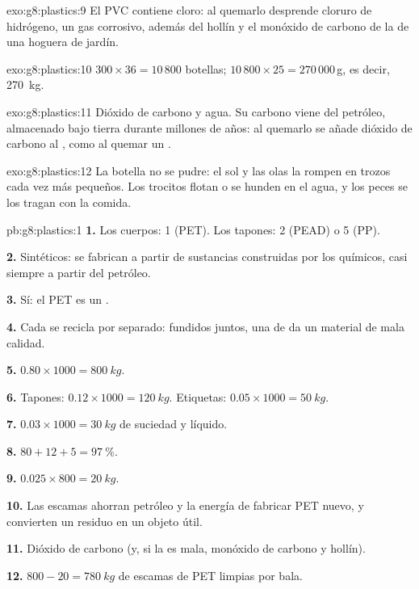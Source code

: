 \begin{solution}{exo:g8:plastics:9}
El PVC contiene cloro: al quemarlo desprende cloruro de hidrógeno, un
gas corrosivo, además del hollín y el monóxido de carbono de la
 de una hoguera de jardín.
\end{solution}

\begin{solution}{exo:g8:plastics:10}
$300 \times 36 = 10\,800$ botellas; $10\,800 \times 25 = 270\,000$\,g, es
decir, \qty{270}{kg}.
\end{solution}

\begin{solution}{exo:g8:plastics:11}
Dióxido de carbono y agua. Su carbono viene del petróleo, almacenado bajo
tierra durante millones de años: al quemarlo se añade dióxido de carbono
al , como al quemar un .
\end{solution}

\begin{solution}{exo:g8:plastics:12}
La botella no se pudre: el sol y las olas la rompen en trozos cada vez
más pequeños. Los trocitos flotan o se hunden en el agua, y los peces
se los tragan con la comida.
\end{solution}

\begin{solution}{pb:g8:plastics:1}
\textbf{1.} Los cuerpos: 1 (PET). Los tapones: 2 (PEAD) o 5 (PP).

\textbf{2.} Sintéticos: se fabrican a partir de sustancias construidas
por los químicos, casi siempre a partir del petróleo.

\textbf{3.} Sí: el PET es un .

\textbf{4.} Cada  se recicla por separado: fundidos juntos, una
 de  da un material de mala calidad.

\textbf{5.} $0.80 \times 1000 = \qty{800}{kg}$.

\textbf{6.} Tapones: $0.12 \times 1000 = \qty{120}{kg}$. Etiquetas: $0.05
\times 1000 = \qty{50}{kg}$.

\textbf{7.} $0.03 \times 1000 = \qty{30}{kg}$ de suciedad y líquido.

\textbf{8.} $80 + 12 + 5 = \qty{97}{\percent}$.

\textbf{9.} $0.025 \times 800 = \qty{20}{kg}$.

\textbf{10.} Las escamas ahorran petróleo y la energía de fabricar PET
nuevo, y convierten un residuo en un objeto útil.

\textbf{11.} Dióxido de carbono (y, si la  es mala, monóxido de
carbono y hollín).

\textbf{12.} $800 - 20 = \qty{780}{kg}$ de escamas de PET limpias por
bala.
\end{solution}

